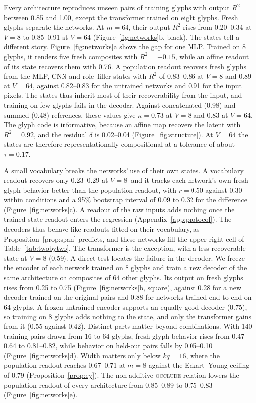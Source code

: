 \documentclass[10pt]{article}
\theoremstyle{plain}
\theoremstyle{remark}
\begin{document}
Every architecture reproduces unseen pairs of training glyphs with output $R^2$ between 0.85 and 1.00, except the transformer trained on eight glyphs. Fresh glyphs separate the networks. At $m = 64$, their output $R^2$ rises from 0.20--0.34 at $V = 8$ to 0.85--0.91 at $V = 64$ (Figure~\ref{fig:networks}b, black). The states tell a different story. Figure~\ref{fig:networks}a shows the gap for one MLP. Trained on 8 glyphs, it renders five fresh composites with $R^2 = -0.15$, while an affine readout of its state recovers them with 0.76. A population readout recovers fresh glyphs from the MLP, CNN and role--filler states with $R^2$ of 0.83--0.86 at $V = 8$ and 0.89 at $V = 64$, against 0.82--0.83 for the untrained networks and 0.91 for the input pixels. The states thus inherit most of their recoverability from the input, and training on few glyphs fails in the decoder. Against concatenated (0.98) and summed (0.48) references, these values give $\kappa = 0.73$ at $V = 8$ and $0.83$ at $V = 64$. The glyph code is informative, because an affine map recovers the latent with $R^2 = 0.92$, and the residual $\delta$ is 0.02--0.04 (Figure~\ref{fig:structure}). At $V = 64$ the states are therefore representationally compositional at a tolerance of about $\tau = 0.17$.

A small vocabulary breaks the networks' use of their own states. A vocabulary readout recovers only 0.23--0.29 at $V = 8$, and it tracks each network's own fresh-glyph behavior better than the population readout, with $r = 0.50$ against $0.30$ within conditions and a 95\% bootstrap interval of 0.09 to 0.32 for the difference (Figure~\ref{fig:networks}c). A readout of the raw inputs adds nothing once the trained-state readout enters the regression (Appendix~\ref{app:protocol}). The decoders thus behave like readouts fitted on their vocabulary, as Proposition~\ref{prop:span} predicts, and these networks fill the upper right cell of Table~\ref{tab:twobytwo}. The transformer is the exception, with a less recoverable state at $V = 8$ (0.59). A direct test locates the failure in the decoder. We freeze the encoder of each network trained on 8 glyphs and train a new decoder of the same architecture on composites of 64 other glyphs. Its output on fresh glyphs rises from 0.25 to 0.75 (Figure~\ref{fig:networks}b, square), against 0.28 for a new decoder trained on the original pairs and 0.88 for networks trained end to end on 64 glyphs. A frozen untrained encoder supports an equally good decoder (0.75), so training on 8 glyphs adds nothing to the state, and only the transformer gains from it (0.55 against 0.42). Distinct parts matter beyond combinations. With 140 training pairs drawn from 16 to 64 glyphs, fresh-glyph behavior rises from 0.47--0.64 to 0.81--0.82, while behavior on held-out pairs falls by 0.05--0.10 (Figure~\ref{fig:networks}d). Width matters only below $kq = 16$, where the population readout reaches 0.67--0.71 at $m = 8$ against the Eckart--Young ceiling of 0.79 (Proposition~\ref{prop:ey}). The non-additive \textsc{occlude} relation lowers the population readout of every architecture from 0.85--0.89 to 0.75--0.83 (Figure~\ref{fig:networks}e).
\end{document}
